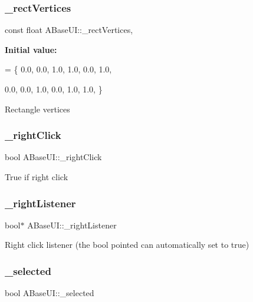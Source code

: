 \subsubsection{\texorpdfstring{\+\_\+rect\+Vertices}{\_rectVertices}}
{\footnotesize\ttfamily const float A\+Base\+U\+I\+::\+\_\+rect\+Vertices\hspace{0.3cm}{\ttfamily [static]}, {\ttfamily [protected]}}

{\bfseries Initial value\+:}
\begin{DoxyCode}
= \{
    0.0, 0.0,
    1.0, 1.0,
    0.0, 1.0,

    0.0, 0.0,
    1.0, 0.0,
    1.0, 1.0,
\}
\end{DoxyCode}
Rectangle vertices \mbox{\label{class_a_base_u_i_a58f9a340b77a03c84b1394a8c0bca1b9}} 
\subsubsection{\texorpdfstring{\+\_\+right\+Click}{\_rightClick}}
{\footnotesize\ttfamily bool A\+Base\+U\+I\+::\+\_\+right\+Click\hspace{0.3cm}{\ttfamily [protected]}}

True if right click \mbox{\label{class_a_base_u_i_a4656f0b7d85d6ed7911ab8d97363e6e3}} 
\subsubsection{\texorpdfstring{\+\_\+right\+Listener}{\_rightListener}}
{\footnotesize\ttfamily bool$\ast$ A\+Base\+U\+I\+::\+\_\+right\+Listener\hspace{0.3cm}{\ttfamily [protected]}}

Right click listener (the bool pointed can automatically set to true) \mbox{\label{class_a_base_u_i_aa8591df596571dddb7b0ef87fbd02f69}} 
\subsubsection{\texorpdfstring{\+\_\+selected}{\_selected}}
{\footnotesize\ttfamily bool A\+Base\+U\+I\+::\+\_\+selected\hspace{0.3cm}{\ttfamily [protected]}}

